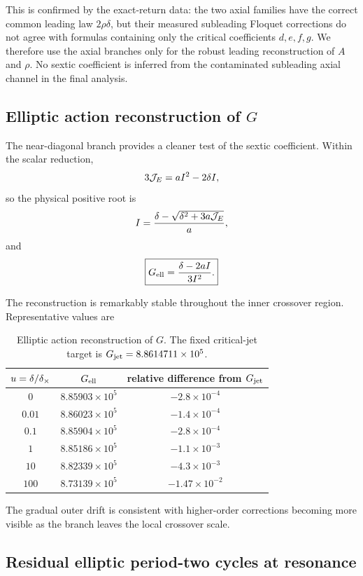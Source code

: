 This is confirmed by the exact-return data: the two axial families have the correct common leading law $2\rho\delta$, but their measured subleading Floquet corrections do not agree with formulas containing only the critical coefficients $d,e,f,g$.  We therefore use the axial branches only for the robust leading reconstruction of $A$ and $\rho$.  No sextic coefficient is inferred from the contaminated subleading axial channel in the final analysis.

\subsection{Elliptic action reconstruction of \texorpdfstring{$G$}{G}}

The near-diagonal branch provides a cleaner test of the sextic coefficient.  Within the scalar reduction,
\[
3\mathcal{J}_E=aI^2-2\delta I,
\]
so the physical positive root is
\[
I
=
\frac{
\delta-\sqrt{\delta^2+3a\mathcal{J}_E}
}{a},
\]
and
\begin{equation}
\boxed{
G_{\rm ell}
=
\frac{\delta-2aI}{3I^2}.
}
\label{eq:Gell}
\end{equation}

The reconstruction is remarkably stable throughout the inner crossover region.  Representative values are
\begin{table}[t]
\centering
\caption{Elliptic action reconstruction of $G$.  The fixed critical-jet target is $G_{\rm jet}=8.8614711\times10^5$.}
\label{tab:Gell}
\begin{tabular}{ccc}
\toprule
$u=\delta/\delta_\times$ & $G_{\rm ell}$ & relative difference from $G_{\rm jet}$ \\
\midrule
$0$    & $8.85903\times10^5$ & $-2.8\times10^{-4}$ \\
$0.01$ & $8.86023\times10^5$ & $-1.4\times10^{-4}$ \\
$0.1$  & $8.85904\times10^5$ & $-2.8\times10^{-4}$ \\
$1$    & $8.85186\times10^5$ & $-1.1\times10^{-3}$ \\
$10$   & $8.82339\times10^5$ & $-4.3\times10^{-3}$ \\
$100$  & $8.73139\times10^5$ & $-1.47\times10^{-2}$ \\
\bottomrule
\end{tabular}
\end{table}
The gradual outer drift is consistent with higher-order corrections becoming more visible as the branch leaves the local crossover scale.

\subsection{Residual elliptic period-two cycles at resonance}

